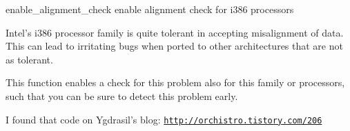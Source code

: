 \begin{DoxyDocu}{enable\_alignment\_check}
\label{crash_8h_a408dcaba63f22945cfcd5cd0efbc0d68_a408dcaba63f22945cfcd5cd0efbc0d68}
enable alignment check for i386 processors

Intel's i386 processor family is quite tolerant in accepting misalignment of data. This can lead to irritating bugs when ported to other architectures that are not as tolerant.

This function enables a check for this problem also for this family or processors, such that you can be sure to detect this problem early.

I found that code on Ygdrasil's blog: \href{http://orchistro.tistory.com/206}{\tt http://orchistro.tistory.com/206}

\end{DoxyDocu}
